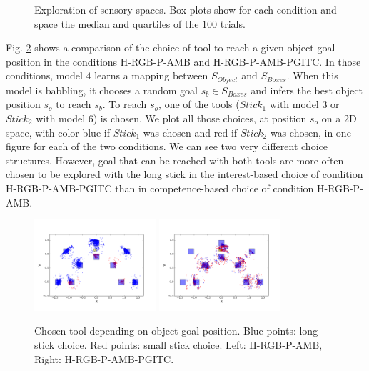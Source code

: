 \documentclass[10pt,letterpaper]{article}
\begin{document}
\begin{figure}[ht]
		\caption{Exploration of sensory spaces. Box plots show for each condition and space the median and quartiles of the $100$ trials.}
		\label{res_explo}
	\end{figure}

	Fig. \ref{res_choice} shows a comparison of the choice of tool to reach a given object goal position in the conditions H-RGB-P-AMB and H-RGB-P-AMB-PGITC.
	In those conditions, model $4$ learns a mapping between $S_{Object}$ and $S_{Boxes}$. 
	When this model is babbling, it chooses a random goal $s_b \in S_{Boxes}$ and infers the best object position $s_o$ to reach $s_b$.
	To reach $s_o$, one of the tools ($Stick_1$ with model $3$ or $Stick_2$ with model $6$) is chosen. 
	We plot all those choices, at position $s_o$ on a $2$D space, with color blue if $Stick_1$ was chosen and red if $Stick_2$ was chosen, in one figure for each of the two conditions.
	We can see two very different choice structures.
	However, goal that can be reached with both tools are more often chosen to be explored with the long stick in the interest-based choice of condition H-RGB-P-AMB-PGITC than in competence-based choice of condition H-RGB-P-AMB.
	
	\begin{figure}[ht]
		\centering
		\includegraphics[width=4.5cm]{./include/H-RGB-P-AMB-log9-choice_mod4.png}
		\hspace{-0.6cm}
		\includegraphics[width=4.5cm]{./include/H-RGB-P-AMB-PGITC-log3-choice_mod4.png}
		\caption{Chosen tool depending on object goal position. Blue points: long stick choice. Red points: small stick choice. Left: H-RGB-P-AMB, Right: H-RGB-P-AMB-PGITC.}
		\label{res_choice}
	\end{figure}
	
\end{document}

